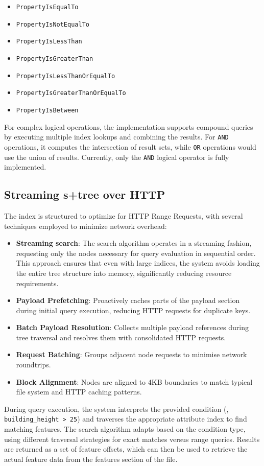 \begin{itemize}
  \item \texttt{PropertyIsEqualTo}
  \item \texttt{PropertyIsNotEqualTo}
  \item \texttt{PropertyIsLessThan}
  \item \texttt{PropertyIsGreaterThan}
  \item \texttt{PropertyIsLessThanOrEqualTo}
  \item \texttt{PropertyIsGreaterThanOrEqualTo}
  \item \texttt{PropertyIsBetween}
\end{itemize}

For complex logical operations, the implementation supports compound queries by executing multiple index lookups and combining the results. For \texttt{AND} operations, it computes the intersection of result sets, while \texttt{OR} operations would use the union of results. Currently, only the \texttt{AND} logical operator is fully implemented.

\subsection{Streaming \texorpdfstring{\ac{s+tree}}{S+tree} over HTTP}
\label{methodology:attribute_index:streaming_s_tree}

The index is structured to optimize for HTTP Range Requests, with several techniques employed to minimize network overhead:

\begin{itemize}
  \item \textbf{Streaming search}: The search algorithm operates in a streaming fashion, requesting only the nodes necessary for query evaluation in sequential order. This approach ensures that even with large indices, the system avoids loading the entire tree structure into memory, significantly reducing resource requirements.
  \item \textbf{Payload Prefetching}: Proactively caches parts of the payload section during initial query execution, reducing HTTP requests for duplicate keys.
  \item \textbf{Batch Payload Resolution}: Collects multiple payload references during tree traversal and resolves them with consolidated HTTP requests.
  \item \textbf{Request Batching}: Groups adjacent node requests to minimise network roundtrips.
  \item \textbf{Block Alignment}: Nodes are aligned to 4KB boundaries to match typical file system and HTTP caching patterns.
\end{itemize}

During query execution, the system interprets the provided condition (\eg, \texttt{building\_height > 25}) and traverses the appropriate attribute index to find matching features. The search algorithm adapts based on the condition type, using different traversal strategies for exact matches versus range queries. Results are returned as a set of feature offsets, which can then be used to retrieve the actual feature data from the features section of the file.

